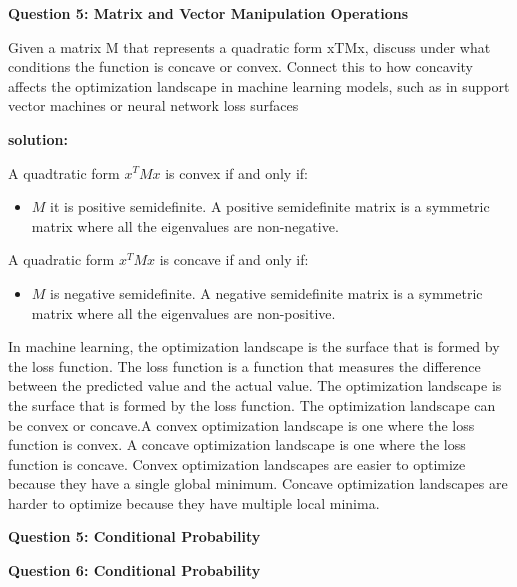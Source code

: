 \documentclass{article}
\begin{document}
\begin{center}
    \large \textbf{Question 5: Matrix and Vector Manipulation Operations}
\end{center}

Given a matrix M that represents a quadratic form xTMx, discuss under what conditions the function is
concave or convex. Connect this to how concavity affects the optimization landscape in machine learning
models, such as in support vector machines or neural network loss surfaces

\textbf{solution:}

A quadtratic form \(x^T M  x\) is convex if and only if:\newline

\begin{itemize}
    \item \(M\) it is positive semidefinite. A positive semidefinite matrix is a symmetric matrix where all the eigenvalues are non-negative.\newline
\end{itemize}

A quadratic form \(x^T M  x\) is concave if and only if:\newline
\begin{itemize}
    \item \(M\) is negative semidefinite. A negative semidefinite matrix is a symmetric matrix where all the eigenvalues are non-positive.\newline
\end{itemize}

In machine learning, the optimization landscape is the surface that is formed by the loss function. The loss function is a function that measures the difference between the predicted value and the actual value. The optimization landscape is the surface that is formed by the loss function. The optimization landscape can be convex or concave.\newline A convex optimization landscape is one where the loss function is convex. A concave optimization landscape is one where the loss function is concave. Convex optimization landscapes are easier to optimize because they have a single global minimum. Concave optimization landscapes are harder to optimize because they have multiple local minima. 


\begin{center}
    \large \textbf{Question 5: Conditional Probability}
\end{center}


\begin{center}
    \large \textbf{Question 6: Conditional Probability}
\end{center}
\end{document}
